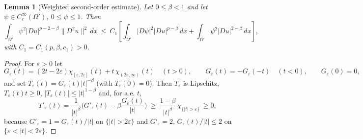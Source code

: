 \documentclass[reqno]{amsart}
\theoremstyle{plain}
\newtheorem{lemma}[theorem]{Lemma}
\theoremstyle{definition}
\theoremstyle{remark}
\newcommand{\eps}{\varepsilon}
\begin{document}
\begin{lemma}[Weighted second-order estimate]\label{lem:cacc2}
Let $0\le\beta<1$ and let $\psi\in C_c^\infty(\Omega')$, $0\le\psi\le1$. Then
\begin{equation}\label{eq:cacc2}
\int_{\Omega'}\psi^2|Du|^{p-2-\beta}\|D^2u\|^2\,dx\ \le\
C_1\left[\int_{\Omega'}|D\psi|^2|Du|^{p-\beta}\,dx+\int_{\Omega'}\psi^2|Du|^{2-\beta}\,dx\right],
\end{equation}
with $C_1=C_1(p,\beta,c_1)>0$.
\end{lemma}

\begin{proof}
For $\eps>0$ let
\[
G_\eps(t)=(2t-2\eps)\chi_{[\eps,2\eps]}(t)+t\,\chi_{(2\eps,\infty)}(t)\quad (t> 0),\qquad
G_\eps(t)=-G_\eps(-t)\quad (t<0),\qquad G_\eps(0)=0,
\]
and set $T_\eps(t)=G_\eps(t)|t|^{-\beta}$ (with $T_\eps(0)=0$). Then $T_\eps$ is Lipschitz,
$T_\eps(t)t\ge0$, $|T_\eps(t)|\le|t|^{1-\beta}$ and, for a.e. $t$,
\begin{equation}\label{eq:Teps}
T'_\eps(t)=\frac{1}{|t|^{\beta}}\Big(G'_\eps(t)-\beta\frac{G_\eps(t)}{|t|}\Big)
\ \ge\ \frac{1-\beta}{|t|^{\beta}}\,\chi_{\{|t|>\eps\}}\ \ge 0 ,
\end{equation}
because $G'_\eps=1=G_\eps(t)/|t|$ on $\{|t|>2\eps\}$ and $G'_\eps=2$,
$G_\eps(t)/|t|\le2$ on $\{\eps<|t|<2\eps\}$.


\end{proof}
\end{document}
